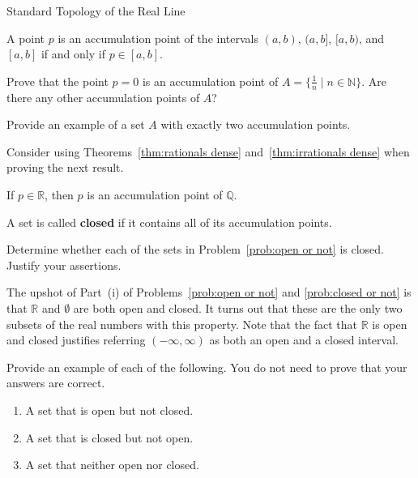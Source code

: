 \begin{section}{Standard Topology of the Real Line}
\begin{theorem}
A point $p$ is an accumulation point of the intervals $(a,b)$, $(a,b]$, $[a,b)$, and $[a,b]$ if and only if $p\in [a,b]$.
\end{theorem}

\begin{problem}
Prove that the point $p=0$ is an accumulation point of $A=\{\frac{1}{n}\mid n \in \mathbb{N}\}$.  Are there any other accumulation points of $A$? 
\end{problem}

\begin{problem}
Provide an example of a set $A$ with exactly two accumulation points.
\end{problem}

Consider using Theorems~\ref{thm:rationals dense} and~\ref{thm:irrationals dense} when proving the next result.

\begin{theorem}
If $p\in\mathbb{R}$, then $p$ is an accumulation point of $\mathbb{Q}$.
\end{theorem}

\begin{definition}
A set is called \textbf{closed} if it contains all of its accumulation points.
\end{definition}

\begin{problem}\label{prob:closed or not}
Determine whether each of the sets in Problem~\ref{prob:open or not} is closed. Justify your assertions.
\end{problem}

The upshot of Part~(i) of Problems~\ref{prob:open or not} and \ref{prob:closed or not} is that $\mathbb{R}$ and $\emptyset$ are both open and closed.  It turns out that these are the only two subsets of the real numbers with this property.  Note that the fact that $\mathbb{R}$ is open and closed justifies referring $(-\infty, \infty)$ as both an open and a closed interval.

\begin{problem}\label{prob:open vs closed}
Provide an example of each of the following.  You do not need to prove that your answers are correct.
\begin{enumerate}[label=\textrm{(\alph*)}]
\item A set that is open but not closed.
\item A set that is closed but not open.
\item\label{prob:open vs closed last} A set that neither open nor closed.
\end{enumerate}
\end{problem}


\end{section}
